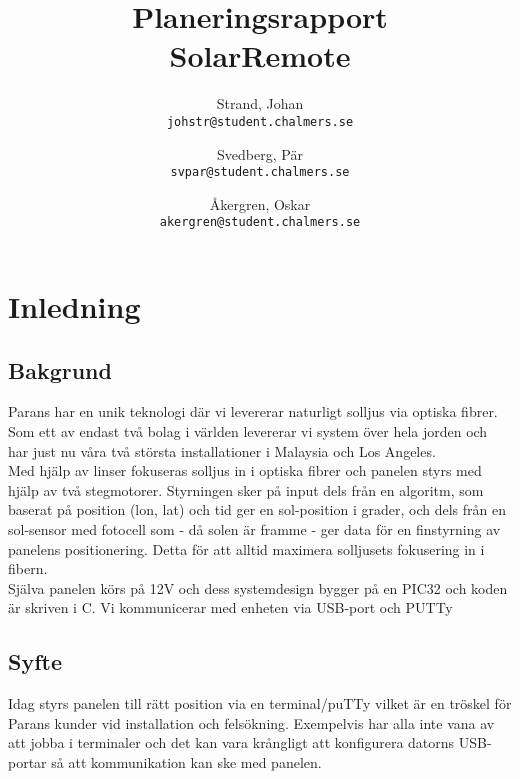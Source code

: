 \documentclass[a4paper]{article}
\author{	Strand, Johan \\ \texttt{johstr@student.chalmers.se} \and
			Svedberg, Pär\\ \texttt{svpar@student.chalmers.se} \and
			Åkergren, Oskar\\ \texttt{akergren@student.chalmers.se}
}
\title{Planeringsrapport \\ SolarRemote}
\begin{document}
	\maketitle
	\thispagestyle{empty}
	
	\newpage

	\tableofcontents
	\setcounter{page}{1}
	
	\newpage

	\section{Inledning} %
	\label{sec:inledning}
	
		\subsection{Bakgrund} %
		\label{sub:bakgrund}

			Parans har en unik teknologi där vi levererar naturligt solljus via optiska fibrer.
			Som ett av endast två bolag i världen levererar vi system över hela jorden och har just nu våra två största installationer i Malaysia och Los Angeles.\\

			\noindent Med hjälp av linser fokuseras solljus in i optiska fibrer och panelen styrs med hjälp av två stegmotorer. Styrningen sker på input dels från en algoritm, som baserat på position (lon, lat) och tid ger en sol-position i grader, och dels från en sol-sensor med fotocell som - då solen är framme - ger data för en finstyrning av panelens positionering.
			Detta för att alltid maximera solljusets fokusering in i fibern.\\

			\noindent Själva panelen körs på 12V och dess systemdesign bygger på en PIC32 och koden är skriven i C. Vi kommunicerar med enheten via USB-port och PUTTy

		\subsection{Syfte} %
		\label{sub:problem}

			Idag styrs panelen till rätt position via en terminal/puTTy vilket är en tröskel för Parans kunder vid installation och felsökning. 
			Exempelvis har alla inte vana av att jobba i terminaler och det kan vara krångligt att konfigurera datorns USB-portar så att kommunikation kan ske med panelen. \\
\end{document}
